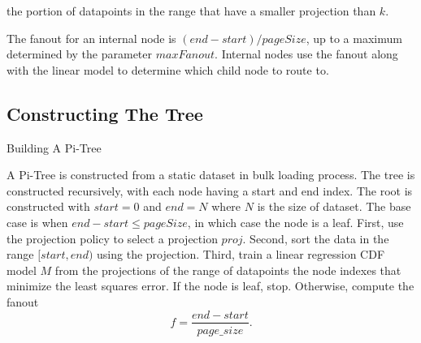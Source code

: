\documentclass[sigconf,10pt]{acmart}
\begin{document}
the portion of datapoints in the range that have a 
smaller projection than $k$.

The fanout for an internal node is $(end - start) / pageSize$, up to a maximum determined
by the parameter $maxFanout$. Internal nodes use the fanout along with the linear model
to determine which child node to route to.

\subsection{Constructing The Tree}

\begin{algorithm}
  \caption{Building A Pi-Tree}
\end{algorithm}

A Pi-Tree is constructed from a static dataset in bulk loading process.
The tree is constructed recursively, with each node having a start and 
end index. The root is constructed with $start=0$ and $end=N$ where $N$
is the size of dataset. The base case is when $end - start \leq pageSize$,
in which case the node is a leaf.
First, use the projection policy to select a projection $proj$.
Second, sort the data in the range $[start, end)$ using the projection.
Third, train a linear regression CDF model $M$ from the projections of the range of datapoints
the node indexes that minimize the least squares error. If the node is leaf, stop. Otherwise,
compute the fanout
\[
  f = \frac{end - start}{page\_size}.
\]
\end{document}
